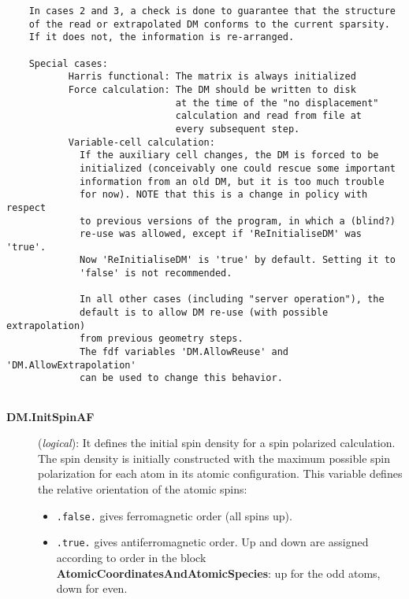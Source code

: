 \documentclass[11pt]{article}
\begin{document}
\begin{description}
\begin{verbatim}
    In cases 2 and 3, a check is done to guarantee that the structure
    of the read or extrapolated DM conforms to the current sparsity.
    If it does not, the information is re-arranged.

    Special cases:
           Harris functional: The matrix is always initialized
           Force calculation: The DM should be written to disk
                              at the time of the "no displacement"
                              calculation and read from file at
                              every subsequent step.
           Variable-cell calculation:
             If the auxiliary cell changes, the DM is forced to be
             initialized (conceivably one could rescue some important
             information from an old DM, but it is too much trouble 
             for now). NOTE that this is a change in policy with respect
             to previous versions of the program, in which a (blind?)
             re-use was allowed, except if 'ReInitialiseDM' was 'true'.
             Now 'ReInitialiseDM' is 'true' by default. Setting it to
             'false' is not recommended.

             In all other cases (including "server operation"), the 
             default is to allow DM re-use (with possible extrapolation) 
             from previous geometry steps.
             The fdf variables 'DM.AllowReuse' and 'DM.AllowExtrapolation'
             can be used to change this behavior.
             
\end{verbatim}


\begin{description}

\item[{\bf DM.InitSpinAF}] ({\it logical}):
It defines the initial spin density for a spin polarized calculation. 
The spin density is initially constructed with the maximum possible
spin polarization for each atom in its atomic configuration.
This variable defines the relative orientation of the atomic
spins: 

\begin{itemize}
\item {\tt .false.} gives ferromagnetic order (all spins up).
\item {\tt .true.} gives antiferromagnetic order. Up and down are
assigned according to order in the block 
{\bf AtomicCoordinatesAndAtomicSpecies}: up for the odd atoms, down for even.
\end{itemize}


\end{description}
\end{description}
\end{document}
